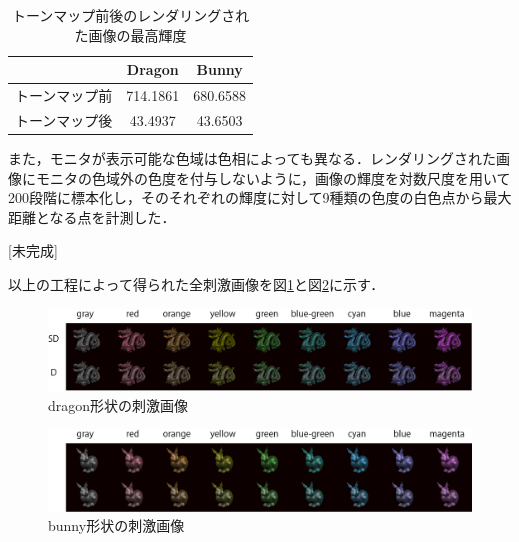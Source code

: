                 \begin{table}[h]
                    \centering
                    \caption{トーンマップ前後のレンダリングされた画像の最高輝度}
                    \begin{tabular}{|l||c|c|} \hline
                                               & Dragon              & Bunny              \\ \hline \hline
                        トーンマップ前         & 714.1861            & 680.6588           \\ \hline
                        トーンマップ後         & 43.4937             & 43.6503            \\ \hline
                    \end{tabular}
                    \label{tonemap}
                \end{table}

                また，モニタが表示可能な色域は色相によっても異なる．レンダリングされた画像にモニタの色域外の色度を付与しないように，画像の輝度を対数尺度を用いて200段階に標本化し，そのそれぞれの輝度に対して9種類の色度の白色点から最大距離となる点を計測した．

                [未完成]

                
            以上の工程によって得られた全刺激画像を図\ref{ex1_stimuli_d}と図\ref{ex1_stimuli_b}に示す．

            \begin{figure}[h]
                \centering
                \includegraphics[width=14.0cm]{./img/ex1_stimuli_d_p.png}
                \caption{dragon形状の刺激画像}
                \label{ex1_stimuli_d}
            \end{figure}

            \begin{figure}[h]
                \centering
                \includegraphics[width=14.0cm]{./img/ex1_stimuli_b_p.png}
                \caption{bunny形状の刺激画像}
                \label{ex1_stimuli_b}
            \end{figure}

